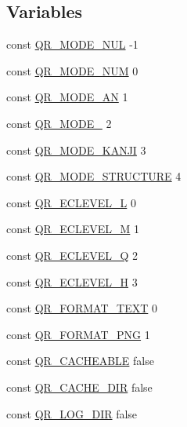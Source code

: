 \subsection*{Variables}
\begin{DoxyCompactItemize}
\item 
const \hyperlink{phpqrcode_8php_a24d6b51d9ddaaefd084528b779b16ffb}{Q\-R\-\_\-\-M\-O\-D\-E\-\_\-\-N\-U\-L} -\/1
\item 
const \hyperlink{phpqrcode_8php_abc8d5a6a5d9977177af9aced52703323}{Q\-R\-\_\-\-M\-O\-D\-E\-\_\-\-N\-U\-M} 0
\item 
const \hyperlink{phpqrcode_8php_a3525e0bd3a1dadffcdb3f1b9a973db8f}{Q\-R\-\_\-\-M\-O\-D\-E\-\_\-\-A\-N} 1
\item 
const \hyperlink{phpqrcode_8php_aa3452182528d53c7b65c6802ad15b772}{Q\-R\-\_\-\-M\-O\-D\-E\-\_} 2
\item 
const \hyperlink{phpqrcode_8php_a2b9cfae389f30855ddfa68fef6ffb5ee}{Q\-R\-\_\-\-M\-O\-D\-E\-\_\-\-K\-A\-N\-J\-I} 3
\item 
const \hyperlink{phpqrcode_8php_ab9c56e5432a5c63b792802d26cff5d9b}{Q\-R\-\_\-\-M\-O\-D\-E\-\_\-\-S\-T\-R\-U\-C\-T\-U\-R\-E} 4
\item 
const \hyperlink{phpqrcode_8php_ae106d3baebd9c27c90b2abadb25df012}{Q\-R\-\_\-\-E\-C\-L\-E\-V\-E\-L\-\_\-\-L} 0
\item 
const \hyperlink{phpqrcode_8php_afa670ea7afad29461222face71c5ba1e}{Q\-R\-\_\-\-E\-C\-L\-E\-V\-E\-L\-\_\-\-M} 1
\item 
const \hyperlink{phpqrcode_8php_ab8794177ecfd3ccdc8a1677ea3e32bbe}{Q\-R\-\_\-\-E\-C\-L\-E\-V\-E\-L\-\_\-\-Q} 2
\item 
const \hyperlink{phpqrcode_8php_a6c2b8366b7a5336d61db447be8884044}{Q\-R\-\_\-\-E\-C\-L\-E\-V\-E\-L\-\_\-\-H} 3
\item 
const \hyperlink{phpqrcode_8php_a31802a9747faed0854c3740a9065df0f}{Q\-R\-\_\-\-F\-O\-R\-M\-A\-T\-\_\-\-T\-E\-X\-T} 0
\item 
const \hyperlink{phpqrcode_8php_ac0680a77cbb0fb197076f71573e47868}{Q\-R\-\_\-\-F\-O\-R\-M\-A\-T\-\_\-\-P\-N\-G} 1
\item 
const \hyperlink{phpqrcode_8php_a2e289dc15e8d9d0c93bcb589e2e4fa7f}{Q\-R\-\_\-\-C\-A\-C\-H\-E\-A\-B\-L\-E} false
\item 
const \hyperlink{phpqrcode_8php_a30bc15179f940c7cefe147c7c10d21d2}{Q\-R\-\_\-\-C\-A\-C\-H\-E\-\_\-\-D\-I\-R} false
\item 
const \hyperlink{phpqrcode_8php_a31f4c0eeeec4e117adbfb95bdc0b34cc}{Q\-R\-\_\-\-L\-O\-G\-\_\-\-D\-I\-R} false

\end{DoxyCompactItemize}
